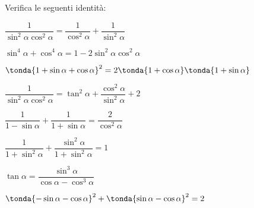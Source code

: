 \begin{esercizio}\label{ese:03.1}
Verifica le seguenti identità:
 \begin{enumeratea}
  \item $\dfrac{1}{\sin^2 \alpha \cos ^2 \alpha} = 
         \dfrac{1}{\cos ^2 \alpha} + \dfrac{1}{\sin^2 \alpha}$
  \item $\sin^4 \alpha + \cos ^4 \alpha = 1 - 2 \sin^2 \alpha \cos ^2 \alpha$
  \item $\tonda{1 + \sin \alpha + \cos \alpha}^2 =
         2 \tonda{1 + \cos \alpha} \tonda{1 + \sin \alpha}$
  \item $\dfrac{1}{\sin^2 \alpha \cos ^2 \alpha} = 
         \tan^2 \alpha + \dfrac{\cos^2 \alpha}{\sin^2 \alpha} + 2$
  \item $\dfrac{1}{1 - \sin \alpha} + \dfrac{1}{1 + \sin \alpha} =
         \dfrac{2}{\cos^2 \alpha}$
  \item $\dfrac{1}{1 + \sin^2 \alpha} + 
         \dfrac{\sin^2 \alpha}{1 + \sin^2 \alpha} = 1$
  \item $\tan \alpha =
         \dfrac{\sin^3 \alpha}{\cos \alpha - \cos^3 \alpha}$
  \item $\tonda{-\sin \alpha - \cos \alpha}^2 +
         \tonda{\sin \alpha - \cos \alpha}^2 = 2$
 \end{enumeratea}
\end{esercizio}

